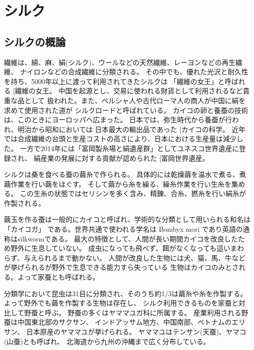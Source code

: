 \documentclass[dvipdfmx,12pt,a4paper]{jreport}
\makeatletter
\DeclareRobustCommand\cite{\unskip
    	\@ifnextchar[{\@tempswatrue\@citex}{\@tempswafalse\@citex[]}}
\makeatother
\begin{document}
		\section{シルク}
		\subsection{シルクの概論}
		繊維は、綿、麻、絹(シルク)、ウールなどの天然繊維、レーヨンなどの再生繊維、
		ナイロンなどの合成繊維に分類される。
		その中でも、優れた光沢と耐久性を持ち、5000年以上に渡って利用されてきたシルクは
		「繊維の女王」と呼ばれる\cite{繊維の女王}。
		中国を起源とし、交易に使われる財貨として利用されるなど貴重な品として
		扱われた。また、ペルシャ人や古代ローマ人の商人が中国に絹を求めて使用された道が
		シルクロードと呼ばれている。
		カイコの卵と養蚕の技術は、このときにヨーロッパへ広まった。
		日本では、弥生時代から養蚕が行われ、明治から昭和においては
		日本最大の輸出品であった\cite{カイコの科学}。
		近年では合成繊維の台頭と生産コストの高さにより、日本における生産量は減少した。
		一方で2014年には「富岡製糸場と絹遺産群」としてユネスコ世界遺産に登録され、
		絹産業の発展に対する貢献が認められた\cite{富岡世界遺産}。

		シルクは桑を食べる蚕の繭糸で作られる。
		具体的には乾燥繭を温水で煮る、煮繭作業を行い繭をほぐす。
		そして繭から糸を繰る、繰糸作業を行い生糸を集める。
		この生糸の状態ではセリシンを多く含み、精錬、合糸、撚糸を行い絹糸が作製される。
		
		繭玉を作る蚕は一般的にカイコと呼ばれ、学術的な分類として用いられる和名は「カイコガ」
		である。世界共通で使われる学名は Bombyx mori であり英語の通称はsilkwormである。
		最大の特徴として、人間が長い期間カイコを改良したため野外に生息していない。
		成虫になっても飛べず、餌がなくなっても這いまわらず、与えられるまで動かない。
		人間が改良した生物には犬、猫、馬、牛などが挙げられるが野外で生息できる能力すら失っている
		生物はカイコのみとされる。よって家蚕とも呼ばれる。

		分類学において昆虫は31目に分類され、そのうち約1/3は繭糸や糸を作製する。
		よって野外でも繭を作製する生物は存在し、
		シルク利用できるものを家蚕と対比して野蚕と呼ぶ。
		野蚕の多くはヤママユガ科に所属する。
		産業利用される野蚕は中国東北部のサクサン、
		インドアッサム地方、中国南部、ベトナムのエリサン、
		日本原産のヤママユが挙げられる。
		ヤママユはテンサン(天蚕)、ヤマコ(山蚕)とも呼ばれ、
		北海道から九州の沖縄まで広く分布している。
\end{document}
